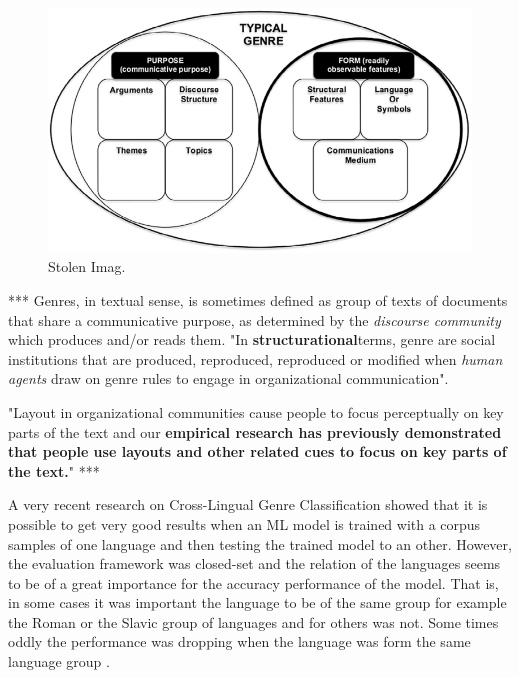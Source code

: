 \begin{figure}[t]
	\begin{center}
    	\includegraphics[scale=0.95]{Figures/Sotlen_diagram.eps}
		\caption{Stolen Imag.}
		\label{fiig:Stolen}
	\end{center}
\end{figure}

***
Genres, in textual sense, is sometimes defined as group of texts of documents that share a communicative purpose, as determined by the \textit{discourse community} which produces and/or reads them. "In \textbf{structurational}terms, genre are social institutions that are produced, reproduced, reproduced or modified when \textit{human agents} draw on genre rules to engage in organizational communication".

"Layout in organizational communities cause people to focus perceptually on key parts of the text and our \textbf{empirical research has previously demonstrated that people use layouts and other related cues to focus on key parts of the text.}"
***

A very recent research on Cross-Lingual Genre Classification showed that it is possible to get very good results when an ML model is trained with a corpus samples of one language and then testing the trained model to an other. However, the evaluation framework was closed-set and the relation of the languages seems to be of a great importance for the accuracy performance of the model. That is, in some cases it was important the language to be of the same group for example the Roman or the Slavic group of languages and for others was not. Some times oddly the performance was dropping when the language was form the same language group \parencite{nguyen2019cross}.

